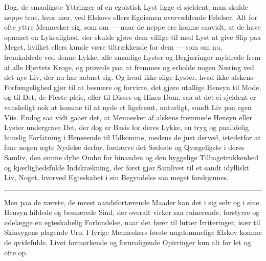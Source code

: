 \documentclass[12pt,a4paper]{book}
\newcommand{\apage}[1]{\marginnote{\footnotesize\textit{[#1]}}}
\begin{document}
Dog, de smaaligste Yttringer af en egoistisk Lyst ligge ei sjeldent, man
skulde neppe troe, hvor nær, ved Elskovs ellers Egoismen overvældende
Følelser. Alt for ofte yttre Mennesker sig, som om --- naar de neppe ere
komne saavidt, at de have opnaaet en Lyksalighed, der skulde gjøre dem
villige til med Lyst at give Slip paa Meget, hvilket ellers kunde være
tiltrækkende for dem --- som om nu, fremkaldede ved denne Lykke, alle
smaalige Lyster og Begjæringer myldrede frem af alle Hjertets Kroge, og
prøvede paa at fremmes og erholde nogen Næring ved det nye Liv, der nu
har aabnet sig. Og hvad ikke slige Lyster, hvad ikke alskens \apage{112}
Forfængelighed gjør til at besnære og forvirre, det gjøre utallige
Hensyn til Mode, og til Det, de Fleste pleie, eller til Disses og Hines
Dom, saa at det ei sjeldent er vanskeligt nok at komme til at nyde et
ligefremt, naturligt, sundt Liv paa egen Viis. Endog saa vidt gaaer det,
at Mennesker af alskens fremmede Hensyn eller Lyster undergrave Det, der
dog er Basis for deres Lykke, en tryg og paalidelig huuslig Forfatning i
Henseende til Udkomme, medens de just derved, istedetfor at faae nogen
ægte Nydelse derfor, fordærve det Sødeste og Qvægeligste i deres Samliv,
den ømme dybe Omhu for hinanden og den hyggelige Tilbagetrukkenhed og
kjærlighedsfulde Indskrækning, der først gjør Samlivet til et sandt
idylliskt Liv, Noget, hvorved Egteskabet i sin Begyndelse saa meget
forskjønnes.

\begin{center}\rule{0.28\linewidth}{0.4pt}\end{center}

Men paa de værste, de meest aandsfortærende Maader kan det i sig selv og
i sine Hensyn hildede og besnærede Sind, der overalt virker saa
ruinerende, forstyrre og ødelægge en egteskabelig Forbindelse, naar det
fører til lutter Irriteringer, især til Skinsygens plagende Uro. I fyrige
Menneskers første ungdommelige Elskov komme de qvidefulde, Livet
formørkende og foruroligende Opirringer kun alt for let og ofte op.
\end{document}
